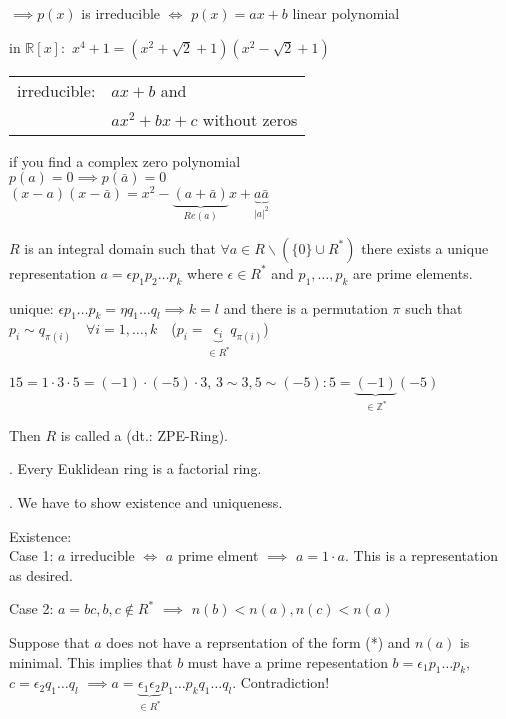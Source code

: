 $\implies p(x)$ is irreducible $\iff$ $p(x) = ax+b$ linear polynomial

in $\mathbb{R}[x]:$
$x^4 + 1 = (x^2 + \sqrt{2} +1)(x^2 - \sqrt{2} + 1)$

\begin{tabular}{ll}
  irreducible: 
    & $ax+b$ and \\
    & $ax^2 + bx + c$ without zeros\\
\end{tabular}

if you find a complex zero polynomial \\
$p(a) = 0 \implies p(\bar{a}) = 0$ \\
$(x-a)(x-\bar{a}) = x^2 - \underbrace{(a + \bar{a})}_{Re(a)} x + \underbrace{a\bar{a}}_{|a|^2}$

\begin{definition}
$R$ is an integral domain such that $\forall a \in R \backslash (\{0\} \cup R^{*})$ 
there exists a unique representation $a = \epsilon p_1 p_2 \ldots p_k$ 
where $\epsilon \in R^{*}$ and $p_1, \ldots, p_k$ are prime elements.

unique: $\epsilon p_1 \ldots p_k = \eta q_1 \ldots q_l \implies k=l$ and there is a permutation $\pi$ such that 
$p_i \sim q_{\pi(i)} \quad \forall i = 1,\ldots, k \quad $($ p_i = \underbrace{\epsilon_i}_{\in R^{*}} q_{\pi(i)} $)

$15 = 1\cdot 3\cdot 5 = (-1) \cdot (-5) \cdot 3$, $ 3 \sim 3, 5 \sim (-5): 5=\underbrace{(-1)}_{\in\mathbb{Z}^{*}} (-5)$

Then $R$ is called a  (dt.: ZPE-Ring). 
\end{definition}

\Theorem.
Every Euklidean ring is a factorial ring.

\Proof.
We have to show existence and uniqueness. 

Existence:\\
Case 1: 
$a$ irreducible $\Leftrightarrow$ $a$ prime elment $\implies$ $a=1\cdot a$. This is a representation as desired. 

Case 2: $a= bc, b,c \not\in R^{*}$ $\implies$ $n(b) < n(a), n(c) < n(a)$

Suppose that $a$ does not have a reprsentation of the form (*) and $n(a)$ is minimal. 
This implies that $b$ must have a prime repesentation $b = \epsilon_1 p_1 \ldots p_k$, $c = \epsilon_2 q_1 \ldots q_l$ 
$\implies a = \underbrace{\epsilon_1 \epsilon_2}_{\in R^{*}} p_1 \ldots p_k q_1 \ldots q_l$. Contradiction!

